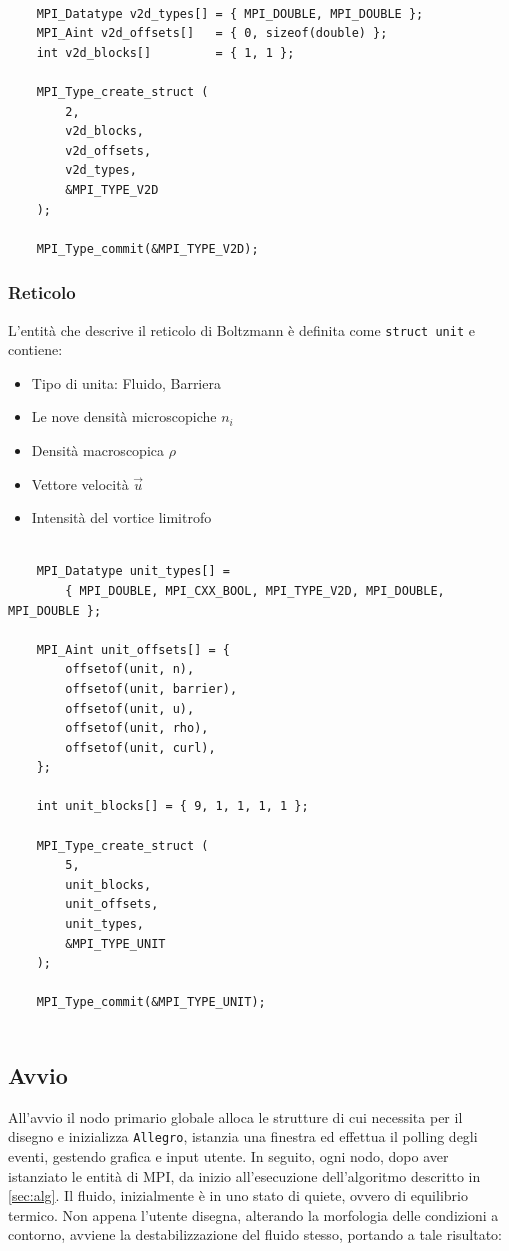 \documentclass[12pt]{article}
\begin{document}
\begin{lstlisting}

    MPI_Datatype v2d_types[] = { MPI_DOUBLE, MPI_DOUBLE };
    MPI_Aint v2d_offsets[]   = { 0, sizeof(double) };
    int v2d_blocks[]         = { 1, 1 };

    MPI_Type_create_struct (
        2, 
        v2d_blocks, 
        v2d_offsets, 
        v2d_types, 
        &MPI_TYPE_V2D
    );
    
    MPI_Type_commit(&MPI_TYPE_V2D);

\end{lstlisting}

\subsubsection{Reticolo}
L'entità che descrive il reticolo di Boltzmann è definita come \verb|struct unit| e contiene:
\begin{itemize}
    \item Tipo di unita: Fluido, Barriera
    \item Le nove densità microscopiche \(n_i\)
    \item Densità macroscopica \(\rho\)
    \item Vettore velocità \(\vec{u}\)
    \item Intensità del vortice limitrofo
\end{itemize}

\begin{lstlisting}

    MPI_Datatype unit_types[] =
        { MPI_DOUBLE, MPI_CXX_BOOL, MPI_TYPE_V2D, MPI_DOUBLE, MPI_DOUBLE };
        
    MPI_Aint unit_offsets[] = {
        offsetof(unit, n),
        offsetof(unit, barrier),
        offsetof(unit, u),
        offsetof(unit, rho),
        offsetof(unit, curl),
    };

    int unit_blocks[] = { 9, 1, 1, 1, 1 };

    MPI_Type_create_struct (
        5, 
        unit_blocks, 
        unit_offsets, 
        unit_types, 
        &MPI_TYPE_UNIT
    );
    
    MPI_Type_commit(&MPI_TYPE_UNIT);
    
\end{lstlisting}



\subsection{Avvio}
All'avvio il nodo primario globale alloca le strutture di cui necessita per il disegno e inizializza \verb|Allegro|, istanzia una finestra ed effettua il polling degli eventi, gestendo grafica e input utente.
In seguito, ogni nodo, dopo aver istanziato le entità di MPI, da inizio all'esecuzione dell'algoritmo descritto in \ref{sec:alg}.
Il fluido, inizialmente è in uno stato di quiete, ovvero di equilibrio termico. Non appena l'utente disegna, alterando la morfologia delle condizioni a contorno, avviene la destabilizzazione del fluido stesso, portando a tale risultato:
\end{document}
